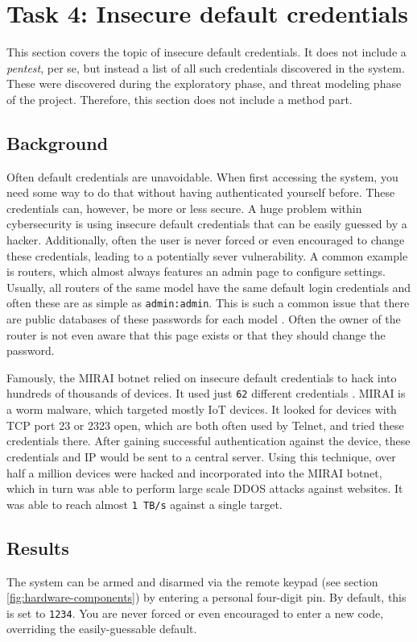 \section{Task 4: Insecure default credentials}
This section covers the topic of insecure default credentials. It does not include a \textit{pentest}, per se, but instead a list of all such credentials discovered in the system. These were discovered during the exploratory phase, and threat modeling phase of the project. Therefore, this section does not include a method part.

\subsection{Background}
Often default credentials are unavoidable. When first accessing the system, you need some way to do that without having authenticated yourself before. These credentials can, however, be more or less secure. A huge problem within cybersecurity is using insecure default credentials that can be easily guessed by a hacker. Additionally, often the user is never forced or even encouraged to change these credentials, leading to a potentially sever vulnerability. A common example is routers, which almost always features an admin page to configure settings. Usually, all routers of the same model have the same default login credentials and often these are as simple as \texttt{admin:admin}. This is such a common issue that there are public databases of these passwords for each model . Often the owner of the router is not even aware that this page exists or that they should change the password.

Famously, the MIRAI botnet relied on insecure default credentials to hack into hundreds of thousands of devices. It used just \texttt{62} different credentials \cite{understanding-mirai}. MIRAI is a worm malware, which targeted mostly IoT devices. It looked for devices with TCP port 23 or 2323 open, which are both often used by Telnet, and tried these credentials there. After gaining successful authentication against the device, these credentials and IP would be sent to a central server. Using this technique, over half a million devices were hacked and incorporated into the MIRAI botnet, which in turn was able to perform large scale DDOS attacks against websites. It was able to reach almost \texttt{1 TB/s} against a single target.

\subsection{Results}
The system can be armed and disarmed via the remote keypad (see section \ref{fig:hardware-components}) by entering a personal four-digit pin. By default, this is set to \texttt{1234}. You are never forced or even encouraged to enter a new code, overriding the easily-guessable default.

